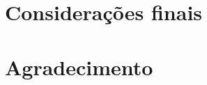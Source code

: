 \documentclass[isoft]{ufgtexposter}
\begin{document}
\begin{poster}
            \lipsum[5]
            \cite{chollet2015keras}     
    
        \section{Considerações finais}
    
            \lipsum[15]
    
        \section{Agradecimento}
    
            \lipsum[57]
    
        
        
    
    
    \end{poster}
\end{document}
